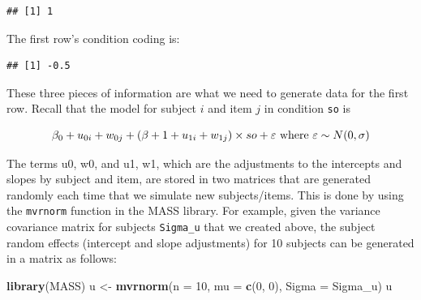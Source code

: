 \documentclass[12pt,]{krantz}
\newenvironment{Shaded}{\begin{snugshade}}{\end{snugshade}}
\newcommand{\DataTypeTok}[1]{\textcolor[rgb]{0.13,0.29,0.53}{#1}}
\newcommand{\DecValTok}[1]{\textcolor[rgb]{0.00,0.00,0.81}{#1}}
\newcommand{\KeywordTok}[1]{\textcolor[rgb]{0.13,0.29,0.53}{\textbf{#1}}}
\newcommand{\NormalTok}[1]{#1}
\newcommand{\OperatorTok}[1]{\textcolor[rgb]{0.81,0.36,0.00}{\textbf{#1}}}
\newcommand{\StringTok}[1]{\textcolor[rgb]{0.31,0.60,0.02}{#1}}
\begin{document}
\begin{Shaded}
\end{Shaded}

\begin{verbatim}
## [1] 1
\end{verbatim}

The first row's condition coding is:

\begin{Shaded}
\end{Shaded}

\begin{verbatim}
## [1] -0.5
\end{verbatim}

These three pieces of information are what we need to generate data for the first row. Recall that the model for subject \(i\) and item \(j\) in condition \texttt{so} is

\begin{equation}
\beta_0 + u_{0i} + w_{0j} + (\beta+1 + u_{1i} + w_{1j})\times so + \varepsilon \hbox{ where } \varepsilon \sim N(0,\sigma)
\end{equation}

The terms u0, w0, and u1, w1, which are the adjustments to the intercepts and slopes by subject and item, are stored in two matrices that are generated randomly each time that we simulate new subjects/items. This is done by using the \texttt{mvrnorm} function in the MASS library. For example, given the variance covariance matrix for subjects \texttt{Sigma\_u} that we created above, the subject random effects (intercept and slope adjustments) for 10 subjects can be generated in a matrix as follows:

\begin{Shaded}
\begin{Highlighting}[]
\KeywordTok{library}\NormalTok{(MASS)}
\NormalTok{u <-}\StringTok{ }\KeywordTok{mvrnorm}\NormalTok{(}\DataTypeTok{n =} \DecValTok{10}\NormalTok{, }\DataTypeTok{mu =} \KeywordTok{c}\NormalTok{(}\DecValTok{0}\NormalTok{, }\DecValTok{0}\NormalTok{), }\DataTypeTok{Sigma =}\NormalTok{ Sigma_u)}
\NormalTok{u}
\end{Highlighting}
\end{Shaded}
\end{document}
